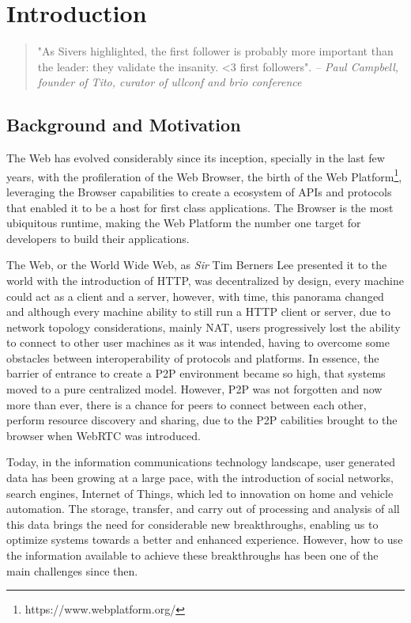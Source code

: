 \chapter{Introduction}\label{ch:intro}

\begin{quotation}
    "As Sivers highlighted, the first follower is probably more important than the leader: they validate the insanity. \textless3 first followers".
    {\small\it -- Paul Campbell, founder of Tito, curator of ullconf and brio conference}
\end{quotation}

\section{Background and Motivation}

The Web has evolved considerably since its inception, specially in the last few years, with the profileration of the Web Browser, the birth of the Web Platform\footnote{https://www.webplatform.org/}, leveraging the Browser capabilities to create a ecosystem of APIs and protocols that enabled it to be a host for first class applications. The Browser is the most ubiquitous runtime, making the Web Platform the number one target for developers to build their applications.

The Web, or the World Wide Web, as \textit{Sir} Tim Berners Lee presented it to the world with the introduction of HTTP, was decentralized by design, every machine could act as a client and a server, however, with time, this panorama changed and although every machine ability to still run a HTTP client or server, due to network topology considerations, mainly NAT, users progressively lost the ability to connect to other user machines as it was intended, having to overcome some obstacles between interoperability of protocols and platforms. In essence, the barrier of entrance to create a P2P environment became so high, that systems moved to a pure centralized model. However, P2P was not forgotten and now more than ever, there is a chance for peers to connect between each other, perform resource discovery and sharing, due to the P2P cabilities brought to the browser when WebRTC was introduced.

Today, in the information communications technology landscape, user generated data has been growing at a large pace, with the introduction of social networks, search engines, Internet of Things, which led to innovation on home and vehicle automation. The storage, transfer, and carry out of processing and analysis of all this data brings the need for considerable new breakthroughs, enabling us to optimize systems towards a better and enhanced experience. However, how to use the information available to achieve these breakthroughs has been one of the main challenges since then.


